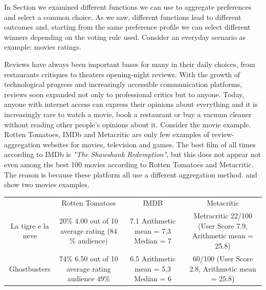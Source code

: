 
In Section  we examined different functions we can use to aggregate preferences and select a common choice. As we saw, different functions lead to different outcomes and, starting from the same preference profile we can select different winners depending on the voting rule used. Consider an everyday scenario as example: movies ratings. 

Reviews have always been important bases for many in their daily choices, from restaurants critiques to theaters opening-night reviews. With the growth of technological progress and increasingly accessible communication platforms, reviews soon expanded not only to professional critics but to anyone. Today, anyone with internet access can express their opinions about everything and it is increasingly rare to watch a movie, book a restaurant or buy a vacuum cleaner without reading other people's opinions about it. Consider the movie example. Rotten Tomatoes, IMDb and Metacritic are only few examples of review-aggregation websites for movies, television and games. The best film of all times according to IMDb is \textit{"The Shawshank Redemption"}, but this does not appear not even among the best 100 movies according to Rotten Tomatoes and Metacritic. The reason is because these platform all use a different aggregation method.  and  show two movies examples. 


\begin{table}[h]
	\label{tab:movies}
	\tiny{
	\begin{tabular}{cccc}
		& Rotten Tomatoes & IMDB & Metacritic \\
		La tigre e la neve & 20$\%$ 4.00 out of 10 average rating  (84$\%$ audience) & 7.1 Arithmetic mean = 7,3   Median = 7 & Metracritic 22/100 (User Score 7.9, Arithmetic mean = 25.8) \\
		Ghostbusters & 74$\%$ 6.50 out of 10 average rating  audience 49$\%$ & 6.5  Arithmetic mean = 5,3   Median = 6 & 60/100 (User Score 2.8, Arithmetic mean = 25.8)
	\end{tabular}
}
\end{table}


%


